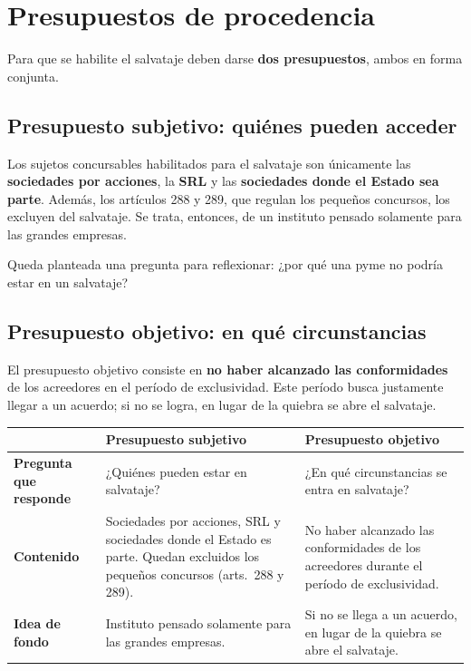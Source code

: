 \documentclass[12pt,oneside]{book}
\begin{document}
\section{Presupuestos de procedencia}

Para que se habilite el salvataje deben darse \textbf{dos presupuestos}, ambos en forma conjunta.

\subsection{Presupuesto subjetivo: quiénes pueden acceder}

Los sujetos concursables habilitados para el salvataje son únicamente las \textbf{sociedades por acciones}, la \textbf{SRL} y las \textbf{sociedades donde el Estado sea parte}. Además, los artículos 288 y 289, que regulan los pequeños concursos, los excluyen del salvataje. Se trata, entonces, de un instituto pensado solamente para las grandes empresas.

\begin{note}
Queda planteada una pregunta para reflexionar: ¿por qué una pyme no podría estar en un salvataje?
\end{note}

\subsection{Presupuesto objetivo: en qué circunstancias}

El presupuesto objetivo consiste en \textbf{no haber alcanzado las conformidades} de los acreedores en el período de exclusividad. Este período busca justamente llegar a un acuerdo; si no se logra, en lugar de la quiebra se abre el salvataje.

\begin{table}[H]
\centering
\small
\begin{tabularx}{\textwidth}{@{}>{\raggedright\arraybackslash}p{3.2cm}YY@{}}
\toprule
 & \textbf{Presupuesto subjetivo} & \textbf{Presupuesto objetivo} \\
\midrule
\textbf{Pregunta que responde} & ¿Quiénes pueden estar en salvataje? & ¿En qué circunstancias se entra en salvataje? \\
\textbf{Contenido} & Sociedades por acciones, SRL y sociedades donde el Estado es parte. Quedan excluidos los pequeños concursos (arts.~288 y 289). & No haber alcanzado las conformidades de los acreedores durante el período de exclusividad. \\
\textbf{Idea de fondo} & Instituto pensado solamente para las grandes empresas. & Si no se llega a un acuerdo, en lugar de la quiebra se abre el salvataje. \\
\bottomrule
\end{tabularx}
\end{table}
\end{document}
